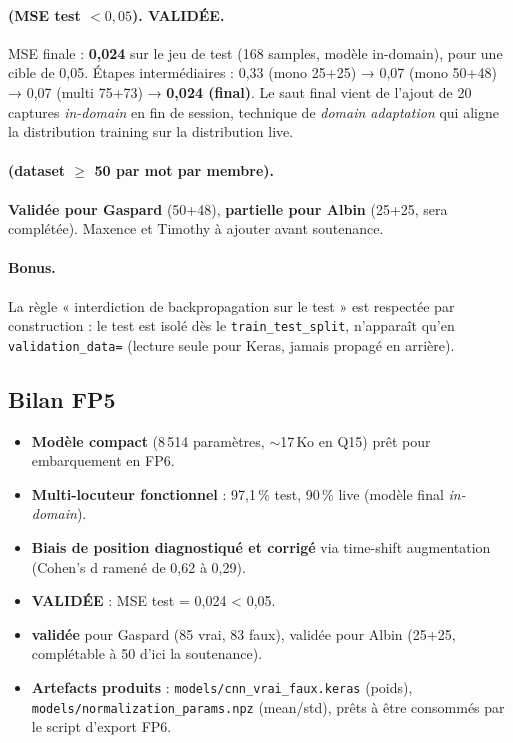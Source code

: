 \paragraph{ (MSE test $< 0{,}05$). \textbf{VALIDÉE}.}
MSE finale : \textbf{0{,}024} sur le jeu de test (168 samples, modèle in-domain), pour une cible de 0{,}05. Étapes intermédiaires : 0{,}33 (mono 25+25) → 0{,}07 (mono 50+48) → 0{,}07 (multi 75+73) → \textbf{0{,}024 (final)}. Le saut final vient de l'ajout de 20 captures \emph{in-domain} en fin de session, technique de \emph{domain adaptation} qui aligne la distribution training sur la distribution live.

\paragraph{ (dataset $\geq$ 50 par mot par membre).}
\textbf{Validée pour Gaspard} (50+48), \textbf{partielle pour Albin} (25+25, sera complétée). Maxence et Timothy à ajouter avant soutenance.

\paragraph{Bonus.} La règle « interdiction de backpropagation sur le test » est respectée par construction : le test est isolé dès le \texttt{train\_test\_split}, n'apparaît qu'en \texttt{validation\_data=} (lecture seule pour Keras, jamais propagé en arrière).

\subsection{Bilan FP5}

\begin{itemize}
    \item \textbf{Modèle compact} (8\,514 paramètres, $\sim$17\,Ko en Q15) prêt pour embarquement en FP6.
    \item \textbf{Multi-locuteur fonctionnel} : 97{,}1\,\% test, 90\,\% live (modèle final \emph{in-domain}).
    \item \textbf{Biais de position diagnostiqué et corrigé} via time-shift augmentation (Cohen's d ramené de 0{,}62 à 0{,}29).
    \item \textbf{ VALIDÉE} : MSE test = 0{,}024 < 0{,}05.
    \item \textbf{ validée} pour Gaspard (85 vrai, 83 faux), validée pour Albin (25+25, complétable à 50 d'ici la soutenance).
    \item \textbf{Artefacts produits} : \texttt{models/cnn\_vrai\_faux.keras} (poids), \texttt{models/normalization\_params.npz} (mean/std), prêts à être consommés par le script d'export FP6.
\end{itemize}

\newpage
